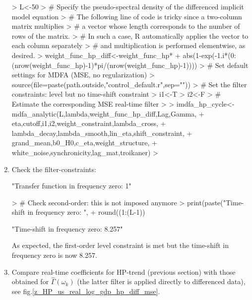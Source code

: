 \documentclass[a4paper]{book}
\begin{document}
\begin{enumerate}
\begin{Schunk}
\begin{Sinput}
> L<-50
> # Specify the pseudo-spectral density of the differenced implicit model equation
> #   The following line of code is tricky since a two-column matrix multiplies
> #   a vector whose length corresponds to the number of rows of the matrix.
> # In such a case, R automatically applies the vector to each column separately
> #   and multiplication is performed elementwise, as desired.
> weight_func_hp_diff<-weight_func_hp*
+   abs(1-exp(-1.i*(0:(nrow(weight_func_hp)-1)*pi/(nrow(weight_func_hp)-1))))
> # Set default settings for MDFA (MSE, no regularization)
> source(file=paste(path.outside,"control_default.r",sep=""))
> # Set the filter constraints: level but no time-shift constraint
> i1<-T
> i2<-F
> # Estimate the corresponding MSE real-time filter
> 
> imdfa_hp_cycle<-mdfa_analytic(L,lambda,weight_func_hp_diff,Lag,Gamma,
+                         eta,cutoff,i1,i2,weight_constraint,lambda_cross,
+                         lambda_decay,lambda_smooth,lin_eta,shift_constraint,
+                         grand_mean,b0_H0,c_eta,weight_structure,
+                         white_noise,synchronicity,lag_mat,troikaner)
> 
\end{Sinput}
\end{Schunk}
\item Check the filter-constraints:
\begin{Schunk}
\begin{Soutput}
[1] "Transfer function in frequency zero: 1"
\end{Soutput}
\begin{Sinput}
> # Check second-order: this is not imposed anymore
> print(paste("Time-shift in frequency zero: ",
+             round((1:(L-1))%
\end{Sinput}
\begin{Soutput}
[1] "Time-shift in frequency zero: 8.257"
\end{Soutput}
\end{Schunk}
As expected, the first-order level constraint is met but the time-shift in frequency zero is now 8.257. 
\item Compare real-time coefficients for HP-trend (previous section) with those obtained for $\hat{\Gamma}(\omega_k)$ (the latter filter is applied directly to differenced data), see fig.\ref{z_HP_us_real_log_gdp_hp_diff_mse}. 

\end{enumerate}
\end{document}
